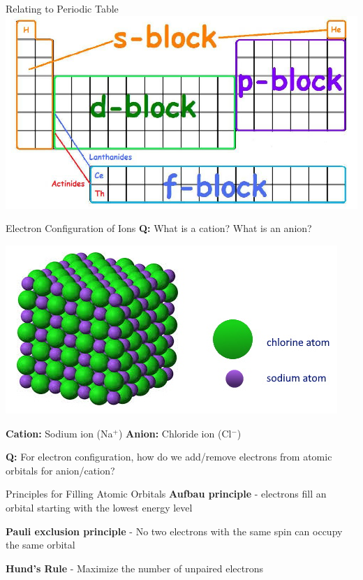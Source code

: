 \documentclass[11pt]{beamer}
\begin{document}
\begin{frame}{Relating to Periodic Table}
  \centering
  \includegraphics[width=\linewidth]{spdf_orbitals}
\end{frame}

\begin{frame}{Electron Configuration of Ions}
  \textbf{Q:} What is a cation? What is an anion?

  \begin{center}
    \includegraphics[width=0.7\linewidth]{nacl}
    \end{center}
    
    \textbf{Cation:} Sodium ion (Na$^+$) \textbf{Anion:} Chloride
    ion (Cl$^-$)

  \textbf{Q:} For electron configuration, how do we add/remove
    electrons from atomic orbitals for anion/cation?
\end{frame}

\begin{frame}{Principles for Filling Atomic Orbitals}
  \textbf{Aufbau principle} - electrons fill an orbital starting with
  the lowest energy level
  
  \textbf{Pauli exclusion principle} - No two electrons with the same
  spin can occupy the same orbital

  \textbf{Hund's Rule} - Maximize the number of unpaired electrons
\end{frame}
\end{document}
